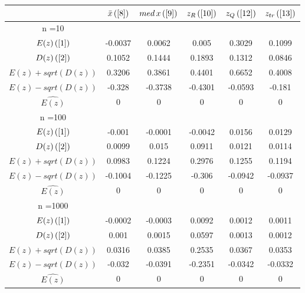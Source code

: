 \begin{tabular}{|c|c|c|c|c|c|}
\hline
 & $\bar{x} \, (\ref{8})$ & $med \, x \, (\ref{9})$ & $z_R \, (\ref{10})$ & $z_Q \, (\ref{12})$ & $z_{tr} \, (\ref{13})$ \\
\hline
n =10 &  &  &  &  & \\
\hline
$E(z) \, (\ref{1})$ & -0.0037 & 0.0062 & 0.005 & 0.3029 & 0.1099\\
\hline
$D(z) \, (\ref{2})$ & 0.1052 & 0.1444 & 0.1893 & 0.1312 & 0.0846\\
\hline
$E(z)+sqrt(D(z))$ & 0.3206 & 0.3861 & 0.4401 & 0.6652 & 0.4008\\
\hline
$E(z)-sqrt(D(z))$ & -0.328 & -0.3738 & -0.4301 & -0.0593 & -0.181\\
\hline
$\hat{E(z)}$ & 0 & 0 & 0 & 0 & 0\\
\hline
n =100 &  &  &  &  & \\
\hline
$E(z) \, (\ref{1})$ & -0.001 & -0.0001 & -0.0042 & 0.0156 & 0.0129\\
\hline
$D(z) \, (\ref{2})$ & 0.0099 & 0.015 & 0.0911 & 0.0121 & 0.0114\\
\hline
$E(z)+sqrt(D(z))$ & 0.0983 & 0.1224 & 0.2976 & 0.1255 & 0.1194\\
\hline
$E(z)-sqrt(D(z))$ & -0.1004 & -0.1225 & -0.306 & -0.0942 & -0.0937\\
\hline
$\hat{E(z)}$ & 0 & 0 & 0 & 0 & 0\\
\hline
n =1000 &  &  &  &  & \\
\hline
$E(z) \, (\ref{1})$ & -0.0002 & -0.0003 & 0.0092 & 0.0012 & 0.0011\\
\hline
$D(z) \, (\ref{2})$ & 0.001 & 0.0015 & 0.0597 & 0.0013 & 0.0012\\
\hline
$E(z)+sqrt(D(z))$ & 0.0316 & 0.0385 & 0.2535 & 0.0367 & 0.0353\\
\hline
$E(z)-sqrt(D(z))$ & -0.032 & -0.0391 & -0.2351 & -0.0342 & -0.0332\\
\hline
$\hat{E(z)}$ & 0 & 0 & 0 & 0 & 0\\
\hline
\end{tabular}